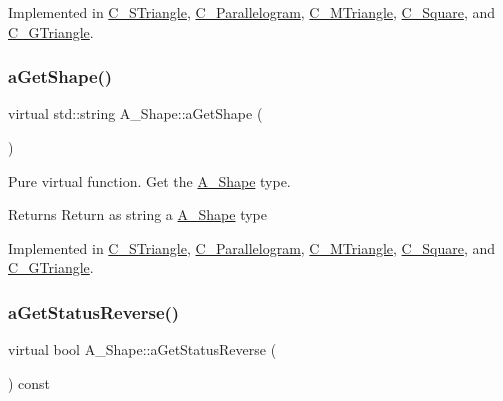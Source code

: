 Implemented in \hyperlink{classC__STriangle_a8d144f4451fe2e5bf6f333d8c37f0f57}{C\+\_\+\+S\+Triangle}, \hyperlink{classC__Parallelogram_ae75f316315134020e8423feff917828e}{C\+\_\+\+Parallelogram}, \hyperlink{classC__MTriangle_ada409f8f1015cf7bf9f9ab8fb11da94b}{C\+\_\+\+M\+Triangle}, \hyperlink{classC__Square_aca738fec39149ed697f3d2413cd7cec2}{C\+\_\+\+Square}, and \hyperlink{classC__GTriangle_af3c514a6f5516c297374004a94788877}{C\+\_\+\+G\+Triangle}.

\mbox{\label{classA__Shape_a1b202256a4e5dcb0edab4ab93a37122c}} 
\subsubsection{\texorpdfstring{a\+Get\+Shape()}{aGetShape()}}
{\footnotesize\ttfamily virtual std\+::string A\+\_\+\+Shape\+::a\+Get\+Shape (\begin{DoxyParamCaption}{ }\end{DoxyParamCaption})\hspace{0.3cm}{\ttfamily [pure virtual]}}



Pure virtual function. Get the \hyperlink{classA__Shape}{A\+\_\+\+Shape} type. 

\begin{DoxyReturn}{Returns}
Return as string a \hyperlink{classA__Shape}{A\+\_\+\+Shape} type 
\end{DoxyReturn}


Implemented in \hyperlink{classC__STriangle_a40c1434870b99112c4457819c9295483}{C\+\_\+\+S\+Triangle}, \hyperlink{classC__Parallelogram_a373fdd3ebdfeffcaa0a72ff7001af8ec}{C\+\_\+\+Parallelogram}, \hyperlink{classC__MTriangle_aca7e38c6bf9695aacf54aa03ecfba978}{C\+\_\+\+M\+Triangle}, \hyperlink{classC__Square_a4919017d3750c1b8deb5f07d22069636}{C\+\_\+\+Square}, and \hyperlink{classC__GTriangle_a039e79bb17dae01997b11243de457d98}{C\+\_\+\+G\+Triangle}.

\mbox{\label{classA__Shape_a24991f7667367b646cae75f60df22e28}} 
\subsubsection{\texorpdfstring{a\+Get\+Status\+Reverse()}{aGetStatusReverse()}}
{\footnotesize\ttfamily virtual bool A\+\_\+\+Shape\+::a\+Get\+Status\+Reverse (\begin{DoxyParamCaption}{ }\end{DoxyParamCaption}) const\hspace{0.3cm}{\ttfamily [pure virtual]}}



